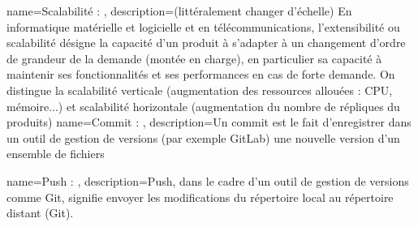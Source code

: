 {
    name=Scalabilité : ,
    description={(littéralement changer d'échelle) En informatique matérielle et logicielle et en télécommunications, l’extensibilité ou scalabilité désigne la capacité d'un produit à s'adapter à un changement d'ordre de grandeur de la demande (montée en charge), en particulier sa capacité à maintenir ses fonctionnalités et ses performances en cas de forte demande. On distingue la scalabilité verticale (augmentation des ressources allouées :  CPU, mémoire...) et scalabilité horizontale (augmentation du nombre de répliques du produits)}
}
{
    name=Commit : ,
    description={Un commit est le fait d’enregistrer dans un outil de gestion de versions (par exemple GitLab) une nouvelle version d’un ensemble de fichiers}
}

{
    name=Push : ,
    description={Push, dans le cadre d'un outil de gestion de versions comme Git, signifie envoyer les modifications du répertoire local au répertoire distant (Git).}
}

